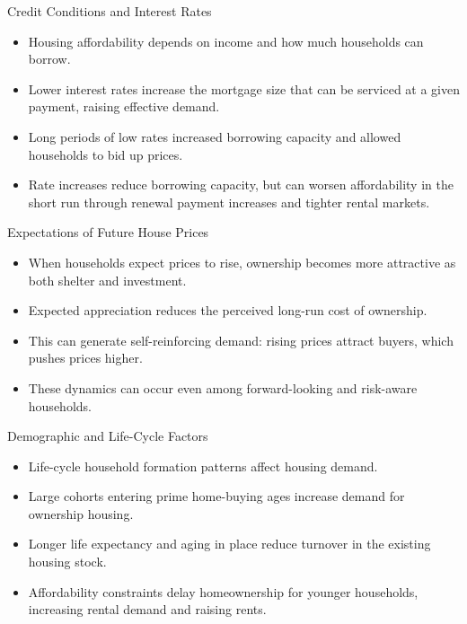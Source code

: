 \documentclass[aspectratio=169]{beamer}
\begin{document}
\begin{frame}{Credit Conditions and Interest Rates}
\transfade
\begin{itemize}[<+->]
  \item Housing affordability depends on income and how much households can borrow.
  \item Lower interest rates increase the mortgage size that can be serviced at a given payment, raising effective demand.
  \item Long periods of low rates increased borrowing capacity and allowed households to bid up prices.
  \item Rate increases reduce borrowing capacity, but can worsen affordability in the short run through renewal payment increases and tighter rental markets.
\end{itemize}
\end{frame}

\begin{frame}{Expectations of Future House Prices}
\transfade
\begin{itemize}[<+->]
  \item When households expect prices to rise, ownership becomes more attractive as both shelter and investment.
  \item Expected appreciation reduces the perceived long-run cost of ownership.
  \item This can generate self-reinforcing demand: rising prices attract buyers, which pushes prices higher.
  \item These dynamics can occur even among forward-looking and risk-aware households.
\end{itemize}
\end{frame}

\begin{frame}{Demographic and Life-Cycle Factors}
\transfade
\begin{itemize}[<+->]
  \item Life-cycle household formation patterns affect housing demand.
  \item Large cohorts entering prime home-buying ages increase demand for ownership housing.
  \item Longer life expectancy and aging in place reduce turnover in the existing housing stock.
  \item Affordability constraints delay homeownership for younger households, increasing rental demand and raising rents.
\end{itemize}
\end{frame}
\end{document}
